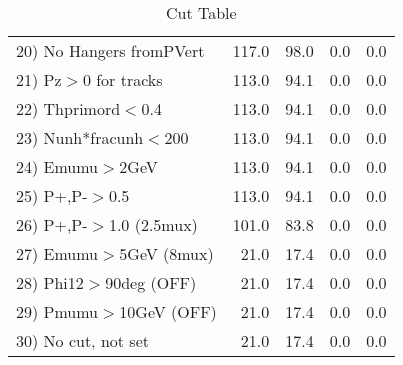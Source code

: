 \begin{table}[h!]
\begin{tabular}{||l||r|r|r|r||}
 20) No Hangers fromPVert &       117.0 &        98.0 &         0.0 &         0.0 \\
 21) Pz$>$0 for tracks    &       113.0 &        94.1 &         0.0 &         0.0 \\
 22) Thprimord$<$0.4      &       113.0 &        94.1 &         0.0 &         0.0 \\
 23) Nunh*fracunh$<$200   &       113.0 &        94.1 &         0.0 &         0.0 \\
 24) Emumu$>$2GeV         &       113.0 &        94.1 &         0.0 &         0.0 \\
 25) P+,P-$>$0.5          &       113.0 &        94.1 &         0.0 &         0.0 \\
 26) P+,P-$>$1.0 (2.5mux) &       101.0 &        83.8 &         0.0 &         0.0 \\
 27) Emumu$>$5GeV  (8mux) &        21.0 &        17.4 &         0.0 &         0.0 \\
 28) Phi12$>$90deg  (OFF) &        21.0 &        17.4 &         0.0 &         0.0 \\
 29) Pmumu$>$10GeV  (OFF) &        21.0 &        17.4 &         0.0 &         0.0 \\
 30) No cut, not set      &        21.0 &        17.4 &         0.0 &         0.0 \\
 \hline
 \hline
 \end{tabular}
 \caption{Cut Table \cohjp  }
 \label{tab-cut__jpsi}
 \end{table}
